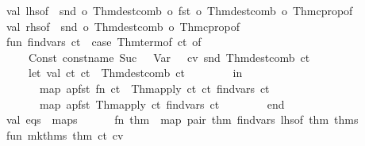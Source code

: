\begin{isabellebody}
\ \ \ \ val\ lhs{\isacharunderscore}of\ {\isacharequal}\ snd\ o\ Thm{\isachardot}dest{\isacharunderscore}comb\ o\ fst\ o\ Thm{\isachardot}dest{\isacharunderscore}comb\ o\ Thm{\isachardot}cprop{\isacharunderscore}of{\isacharsemicolon}\isanewline
\ \ \ \ val\ rhs{\isacharunderscore}of\ {\isacharequal}\ snd\ o\ Thm{\isachardot}dest{\isacharunderscore}comb\ o\ Thm{\isachardot}cprop{\isacharunderscore}of{\isacharsemicolon}\isanewline
\ \ \ \ fun\ find{\isacharunderscore}vars\ ct\ {\isacharequal}\ {\isacharparenleft}case\ Thm{\isachardot}term{\isacharunderscore}of\ ct\ of\isanewline
\ \ \ \ \ \ \ \ {\isacharparenleft}Const\ {\isacharparenleft}{\isacharat}{\isacharbraceleft}const{\isacharunderscore}name\ Suc{\isacharbraceright}{\isacharcomma}\ {\isacharunderscore}{\isacharparenright}\ {\isachardollar}\ Var\ {\isacharunderscore}{\isacharparenright}\ {\isacharequal}{\isachargreater}\ {\isacharbrackleft}{\isacharparenleft}cv{\isacharcomma}\ snd\ {\isacharparenleft}Thm{\isachardot}dest{\isacharunderscore}comb\ ct{\isacharparenright}{\isacharparenright}{\isacharbrackright}\isanewline
\ \ \ \ \ \ {\isacharbar}\ {\isacharunderscore}\ {\isachardollar}\ {\isacharunderscore}\ {\isacharequal}{\isachargreater}\isanewline
\ \ \ \ \ \ \ \ let\ val\ {\isacharparenleft}ct{}{\isacharcomma}\ ct{}{\isacharparenright}\ {\isacharequal}\ Thm{\isachardot}dest{\isacharunderscore}comb\ ct\isanewline
\ \ \ \ \ \ \ \ in\ \isanewline
\ \ \ \ \ \ \ \ \ \ map\ {\isacharparenleft}apfst\ {\isacharparenleft}fn\ ct\ {\isacharequal}{\isachargreater}\ Thm{\isachardot}apply\ ct\ ct{}{\isacharparenright}{\isacharparenright}\ {\isacharparenleft}find{\isacharunderscore}vars\ ct{}{\isacharparenright}\ {\isacharat}\isanewline
\ \ \ \ \ \ \ \ \ \ map\ {\isacharparenleft}apfst\ {\isacharparenleft}Thm{\isachardot}apply\ ct{}{\isacharparenright}{\isacharparenright}\ {\isacharparenleft}find{\isacharunderscore}vars\ ct{}{\isacharparenright}\isanewline
\ \ \ \ \ \ \ \ end\isanewline
\ \ \ \ \ \ {\isacharbar}\ {\isacharunderscore}\ {\isacharequal}{\isachargreater}\ {\isacharbrackleft}{\isacharbrackright}{\isacharparenright}{\isacharsemicolon}\isanewline
\ \ \ \ val\ eqs\ {\isacharequal}\ maps\isanewline
\ \ \ \ \ \ {\isacharparenleft}fn\ thm\ {\isacharequal}{\isachargreater}\ map\ {\isacharparenleft}pair\ thm{\isacharparenright}\ {\isacharparenleft}find{\isacharunderscore}vars\ {\isacharparenleft}lhs{\isacharunderscore}of\ thm{\isacharparenright}{\isacharparenright}{\isacharparenright}\ thms{\isacharsemicolon}\isanewline
\ \ \ \ fun\ mk{\isacharunderscore}thms\ {\isacharparenleft}thm{\isacharcomma}\ {\isacharparenleft}ct{\isacharcomma}\ cv{\isacharprime}{\isacharparenright}{\isacharparenright}\ {\isacharequal}\isanewline

\end{isabellebody}
